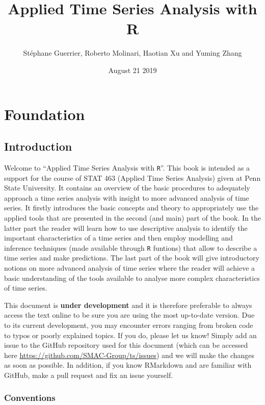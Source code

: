 \documentclass[]{book}
\title{Applied Time Series Analysis with R}
\author{Stéphane Guerrier, Roberto Molinari, Haotian Xu and Yuming Zhang}
\date{August 21 2019}
\theoremstyle{definition}
\theoremstyle{definition}
\theoremstyle{definition}
\theoremstyle{remark}
\let\BeginKnitrBlock\begin \let\EndKnitrBlock\end
\begin{document}
\maketitle

{
\setcounter{tocdepth}{1}
\tableofcontents
}
\part{Foundation}\label{part-foundation}

\chapter{Introduction}\label{introduction}

Welcome to ``Applied Time Series Analysis with \texttt{R}''. This book
is intended as a support for the course of STAT 463 (Applied Time Series
Analysis) given at Penn State University. It contains an overview of the
basic procedures to adequately approach a time series analysis with
insight to more advanced analysis of time series. It firstly introduces
the basic concepts and theory to appropriately use the applied tools
that are presented in the second (and main) part of the book. In the
latter part the reader will learn how to use descriptive analysis to
identify the important characteristics of a time series and then employ
modelling and inference techniques (made available through \texttt{R}
funtions) that allow to describe a time series and make predictions. The
last part of the book will give introductory notions on more advanced
analysis of time series where the reader will achieve a basic
understanding of the tools available to analyse more complex
characteristics of time series.

\BeginKnitrBlock{rmdimportant}
This document is \textbf{under development} and it is therefore
preferable to always access the text online to be sure you are using the
most up-to-date version. Due to its current development, you may
encounter errors ranging from broken code to typos or poorly explained
topics. If you do, please let us know! Simply add an issue to the GitHub
repository used for this document (which can be accessed here
\url{https://github.com/SMAC-Group/ts/issues}) and we will make the
changes as soon as possible. In addition, if you know RMarkdown and are
familiar with GitHub, make a pull request and fix an issue yourself.
\EndKnitrBlock{rmdimportant}

\section{Conventions}\label{conventions}
\end{document}
